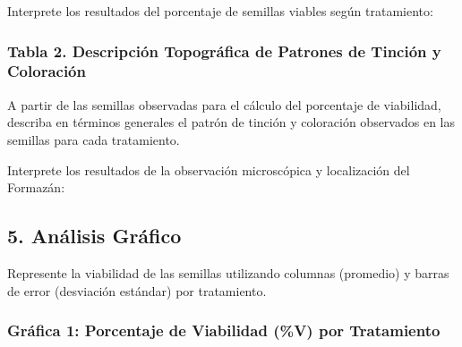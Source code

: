 \documentclass[
  spanish,
  10pt,
  letterpaper,
  twocolumn]{article}
\begin{document}
Interprete los resultados del porcentaje de semillas viables según
tratamiento:

\hrulefill

\hrulefill

\hrulefill

\hrulefill

\hrulefill

\hrulefill

\subsubsection{Tabla 2. Descripción Topográfica de Patrones de Tinción y
Coloración}\label{tabla-2.-descripciuxf3n-topogruxe1fica-de-patrones-de-tinciuxf3n-y-coloraciuxf3n}

A partir de las semillas observadas para el cálculo del porcentaje de
viabilidad, describa en términos generales el patrón de tinción y
coloración observados en las semillas para cada tratamiento.

\begin{center}
\end{center}

Interprete los resultados de la observación microscópica y localización
del Formazán:

\hrulefill

\hrulefill

\hrulefill

\hrulefill

\hrulefill

\hrulefill

\subsection{5. Análisis Gráfico}\label{anuxe1lisis-gruxe1fico}

Represente la viabilidad de las semillas utilizando columnas (promedio)
y barras de error (desviación estándar) por tratamiento.

\subsubsection{Gráfica 1: Porcentaje de Viabilidad (\%V) por
Tratamiento}\label{gruxe1fica-1-porcentaje-de-viabilidad-v-por-tratamiento}
\end{document}
